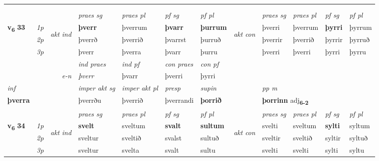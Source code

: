 \begin{longtable}[l]{X>{\footnotesize\itshape}llXXXXlXXXX}
\midrule
   & \\*
  & \\
   \midrule
 & &   & \textit{praes sg}  & \textit{praes pl}    & \textit{ pf sg} & \textit{pf pl} & & \textit{praes sg}  & \textit{praes pl}    & \textit{pf sg} & \textit{pf pl }  \\ \cmidrule{4-7} \cmidrule{9-12}
 \multirow{2}{*}{{{\textbf{v{\textsubscript{6}}} \Large{\textbf{33}}}}}  & 1p & \multirow{3}{*}{\begin{turn}{90}\textit{akt ind}\end{turn}} & \textbf{þverr} & þverrum & \textbf{þvarr} & \textbf{þurrum} & \multirow{3}{*}{\begin{turn}{90}\textit{akt con}\end{turn}} &þverri & þverrum & \textbf{þyrri} & þyrrum\\*
 & 2p &  &  þverrð  & þverrið & þvarrst & þurruð & & þverrir & þverrið & þyrrir & þyrruð \\*
 & 3p &  & þverr & þverra & þvarr & þurru & & þverri & þverri& þyrri & þyrru \\*
\cmidrule{4-7} \cmidrule{9-12}

   && &  \textit{ind praes} & \textit{ind pf} & \textit{con praes} & \textit{con pf} \\*
\multicolumn{3}{r}{\textit{e-n}} & þverr & þvarr & þverri & þyrri \\*

\cmidrule{4-7}
   {\textit{inf}} & &  & \textit{imper akt sg} & \textit{imper akt pl}   & \textit{presp} & \textit{supin}  && \textit{pp m} \\*
  {\textbf{þverra}} & && þverrðu  & þverrið   & þverrandi &  \textbf{þorrið}  && \multicolumn{2}{l}{\textbf{þorrinn} adj\textbf{\textsubscript{6-2}}} \\*

\midrule

 & &   & \textit{praes sg}  & \textit{praes pl}    & \textit{ pf sg} & \textit{pf pl} & & \textit{praes sg}  & \textit{praes pl}    & \textit{pf sg} & \textit{pf pl }  \\ \cmidrule{4-7} \cmidrule{9-12}
 \multirow{2}{*}{{{\textbf{v{\textsubscript{6}}} \Large{\textbf{34}}}}}  & 1p & \multirow{3}{*}{\begin{turn}{90}\textit{akt ind}\end{turn}} & \textbf{svelt} & sveltum & \textbf{svalt} & \textbf{sultum} & \multirow{3}{*}{\begin{turn}{90}\textit{akt con}\end{turn}} &svelti & sveltum & \textbf{sylti} & syltum\\*
 & 2p &  &  sveltur  & sveltið & svalst & sultuð & & sveltir & sveltið & syltir & syltuð \\*
 & 3p &  & sveltur & svelta & svalt & sultu & & svelti & svelti& sylti & syltu \\*
\cmidrule{4-7} \cmidrule{9-12}


\end{longtable}
